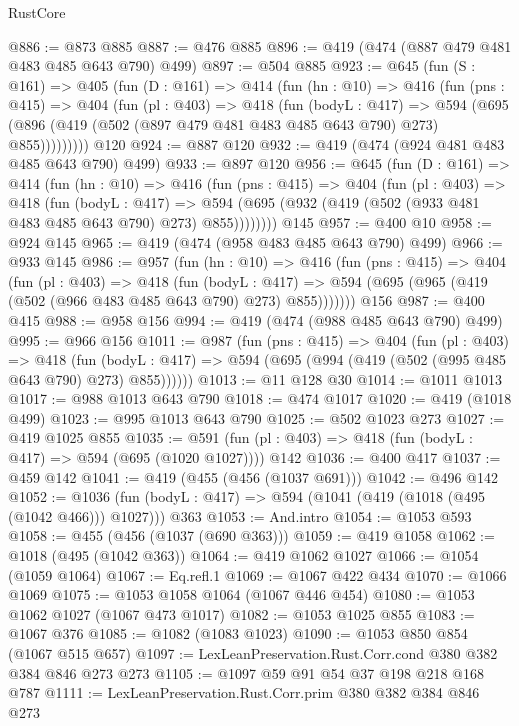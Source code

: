 \begin{lexlean}{RustCore}
\begin{coremodule}
{\begin{coremodule}
{{{{{@886 := @873 @885
@887 := @476 @885
@896 := @419 (@474 (@887 @479 @481 @483 @485 @643 @790) @499)
@897 := @504 @885
@923 := @645
    (fun (S : @161) =>
    @405
      (fun (D : @161) =>
      @414
        (fun (hn : @10) =>
        @416
          (fun (pns : @415) =>
          @404
            (fun (pl : @403) =>
            @418
              (fun (bodyL : @417) =>
              @594 (@695 (@896 (@419 (@502 (@897 @479 @481 @483 @485 @643 @790) @273) @855)))))))))
    @120
@924 := @887 @120
@932 := @419 (@474 (@924 @481 @483 @485 @643 @790) @499)
@933 := @897 @120
@956 := @645
    (fun (D : @161) =>
    @414
      (fun (hn : @10) =>
      @416
        (fun (pns : @415) =>
        @404
          (fun (pl : @403) =>
          @418
            (fun (bodyL : @417) =>
            @594 (@695 (@932 (@419 (@502 (@933 @481 @483 @485 @643 @790) @273) @855))))))))
    @145
@957 := @400 @10
@958 := @924 @145
@965 := @419 (@474 (@958 @483 @485 @643 @790) @499)
@966 := @933 @145
@986 := @957
    (fun (hn : @10) =>
    @416
      (fun (pns : @415) =>
      @404
        (fun (pl : @403) =>
        @418
          (fun (bodyL : @417) =>
          @594 (@695 (@965 (@419 (@502 (@966 @483 @485 @643 @790) @273) @855)))))))
    @156
@987 := @400 @415
@988 := @958 @156
@994 := @419 (@474 (@988 @485 @643 @790) @499)
@995 := @966 @156
@1011 := @987
    (fun (pns : @415) =>
    @404
      (fun (pl : @403) =>
      @418
        (fun (bodyL : @417) => @594 (@695 (@994 (@419 (@502 (@995 @485 @643 @790) @273) @855))))))
@1013 := @11 @128 @30
@1014 := @1011 @1013
@1017 := @988 @1013 @643 @790
@1018 := @474 @1017
@1020 := @419 (@1018 @499)
@1023 := @995 @1013 @643 @790
@1025 := @502 @1023 @273
@1027 := @419 @1025 @855
@1035 := @591 (fun (pl : @403) => @418 (fun (bodyL : @417) => @594 (@695 (@1020 @1027)))) @142
@1036 := @400 @417
@1037 := @459 @142
@1041 := @419 (@455 (@456 (@1037 @691)))
@1042 := @496 @142
@1052 := @1036 (fun (bodyL : @417) => @594 (@1041 (@419 (@1018 (@495 (@1042 @466))) @1027))) @363
@1053 := And.intro
@1054 := @1053 @593
@1058 := @455 (@456 (@1037 (@690 @363)))
@1059 := @419 @1058
@1062 := @1018 (@495 (@1042 @363))
@1064 := @419 @1062 @1027
@1066 := @1054 (@1059 @1064)
@1067 := Eq.refl.{1}
@1069 := @1067 @422 @434
@1070 := @1066 @1069
@1075 := @1053 @1058 @1064 (@1067 @446 @454)
@1080 := @1053 @1062 @1027 (@1067 @473 @1017)
@1082 := @1053 @1025 @855
@1083 := @1067 @376
@1085 := @1082 (@1083 @1023)
@1090 := @1053 @850 @854 (@1067 @515 @657)
@1097 := LexLeanPreservation.Rust.Corr.cond @380 @382 @384 @846 @273 @273
@1105 := @1097 @59 @91 @54 @37 @198 @218 @168 @787
@1111 := LexLeanPreservation.Rust.Corr.prim @380 @382 @384 @846 @273
}}}}}
\end{coremodule}}
\end{coremodule}
\end{lexlean}
